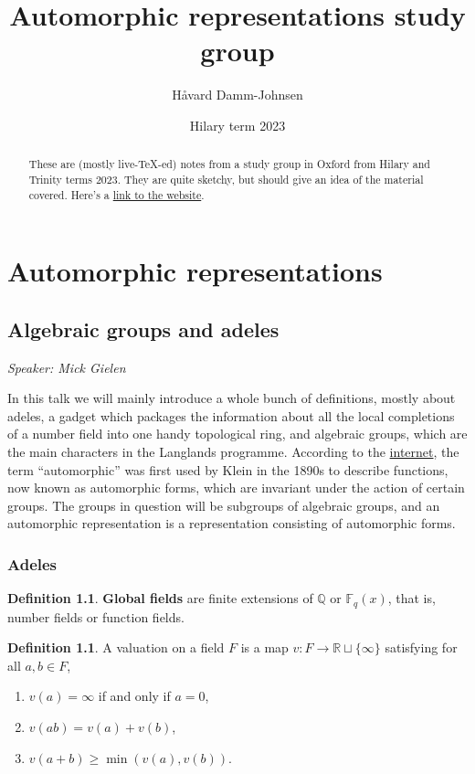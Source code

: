 \documentclass[11pt]{report}
\newcommand{\1}{\mathbbm 1}
\newcommand{\Q}{\mathbb{Q}}
\newcommand{\R}{\mathbb{R}}
\newcommand{\F}{\mathbb{F}}
\theoremstyle{plain}
\newcounter{ex}
\theoremstyle{definition}
\newtheorem{mydef}[thm]{Definition}
\theoremstyle{remark}
\numberwithin{equation}{section}
\begin{document}
\title{Automorphic representations study group}
\author{Håvard Damm-Johnsen}
\date{Hilary term 2023}
\maketitle
\begin{abstract}
  These are (mostly live-\TeX-ed) notes from a study group in Oxford
  from Hilary and Trinity terms 2023. They are quite sketchy, but
  should give an idea of the material covered. Here's
  a
  \href{https://users.ox.ac.uk/~quee4127/automorphic/autom.html}{link
    to the website}.\vspace{-10pt}
\end{abstract}
\tableofcontents

\chapter{Automorphic representations}
\section{Algebraic groups and adeles}
\emph{Speaker: Mick Gielen}

In this talk we will mainly introduce a whole bunch of definitions,
mostly about adeles, a gadget which packages the information about all
the local completions of a number field into one handy topological
ring, and algebraic groups, which are the main characters in the
Langlands programme. According to
the \href{https://mathshistory.st-andrews.ac.uk/Miller/a/}{internet},
the term ``automorphic'' was first used by Klein in the 1890s
to describe functions, now known as automorphic forms, which are
invariant under the action of certain groups. The groups in question
will be subgroups of algebraic groups, and an automorphic
representation is a representation consisting of automorphic forms.
\subsection{Adeles}
\begin{mydef}
  \textbf{Global fields} are finite extensions of $\Q$ or $\F_{q}(x)$,
  that is, number fields or function fields.
\end{mydef}

\begin{mydef}
  A valuation on a field $F$ is a map $v : F \to \R \sqcup \{\infty\}$ satisfying
  for all $a,b \in F$, 
  \begin{enumerate}
  \item $v(a)= \infty$ if and only if $a = 0$,
  \item $v(ab) = v(a) + v(b)$,
  \item $v(a+b) \ge \min(v(a),v(b))$.
  \end{enumerate}
\end{mydef}
\end{document}
